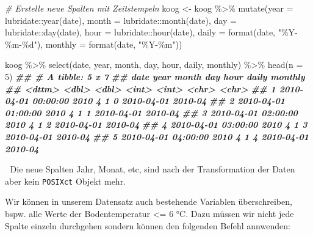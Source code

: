\documentclass[
]{article}
\newenvironment{Shaded}{\begin{snugshade}}{\end{snugshade}}
\newcommand{\AttributeTok}[1]{\textcolor[rgb]{0.77,0.63,0.00}{#1}}
\newcommand{\CommentTok}[1]{\textcolor[rgb]{0.56,0.35,0.01}{\textit{#1}}}
\newcommand{\DecValTok}[1]{\textcolor[rgb]{0.00,0.00,0.81}{#1}}
\newcommand{\DocumentationTok}[1]{\textcolor[rgb]{0.56,0.35,0.01}{\textbf{\textit{#1}}}}
\newcommand{\FunctionTok}[1]{\textcolor[rgb]{0.00,0.00,0.00}{#1}}
\newcommand{\NormalTok}[1]{#1}
\newcommand{\OtherTok}[1]{\textcolor[rgb]{0.56,0.35,0.01}{#1}}
\newcommand{\SpecialCharTok}[1]{\textcolor[rgb]{0.00,0.00,0.00}{#1}}
\newcommand{\StringTok}[1]{\textcolor[rgb]{0.31,0.60,0.02}{#1}}
\begin{document}
\begin{Shaded}
\begin{Highlighting}[]
\CommentTok{\# Erstelle neue Spalten mit Zeitstempeln}
\NormalTok{koog }\OtherTok{\textless{}{-}}\NormalTok{ koog }\SpecialCharTok{\%\textgreater{}\%}
  \FunctionTok{mutate}\NormalTok{(}\AttributeTok{year =}\NormalTok{ lubridate}\SpecialCharTok{::}\FunctionTok{year}\NormalTok{(date),}
         \AttributeTok{month =}\NormalTok{ lubridate}\SpecialCharTok{::}\FunctionTok{month}\NormalTok{(date),}
         \AttributeTok{day =}\NormalTok{ lubridate}\SpecialCharTok{::}\FunctionTok{day}\NormalTok{(date),}
         \AttributeTok{hour =}\NormalTok{ lubridate}\SpecialCharTok{::}\FunctionTok{hour}\NormalTok{(date), }
         \AttributeTok{daily =} \FunctionTok{format}\NormalTok{(date, }\StringTok{"\%Y{-}\%m{-}\%d"}\NormalTok{),}
         \AttributeTok{monthly =} \FunctionTok{format}\NormalTok{(date, }\StringTok{"\%Y{-}\%m"}\NormalTok{))}

\NormalTok{koog }\SpecialCharTok{\%\textgreater{}\%}
  \FunctionTok{select}\NormalTok{(date, year, month, day, hour, daily, monthly) }\SpecialCharTok{\%\textgreater{}\%}
  \FunctionTok{head}\NormalTok{(}\AttributeTok{n =} \DecValTok{5}\NormalTok{)}
\DocumentationTok{\#\# \# A tibble: 5 x 7}
\DocumentationTok{\#\#   date                 year month   day  hour daily      monthly}
\DocumentationTok{\#\#   \textless{}dttm\textgreater{}              \textless{}dbl\textgreater{} \textless{}dbl\textgreater{} \textless{}int\textgreater{} \textless{}int\textgreater{} \textless{}chr\textgreater{}      \textless{}chr\textgreater{}  }
\DocumentationTok{\#\# 1 2010{-}04{-}01 00:00:00  2010     4     1     0 2010{-}04{-}01 2010{-}04}
\DocumentationTok{\#\# 2 2010{-}04{-}01 01:00:00  2010     4     1     1 2010{-}04{-}01 2010{-}04}
\DocumentationTok{\#\# 3 2010{-}04{-}01 02:00:00  2010     4     1     2 2010{-}04{-}01 2010{-}04}
\DocumentationTok{\#\# 4 2010{-}04{-}01 03:00:00  2010     4     1     3 2010{-}04{-}01 2010{-}04}
\DocumentationTok{\#\# 5 2010{-}04{-}01 04:00:00  2010     4     1     4 2010{-}04{-}01 2010{-}04}
\end{Highlighting}
\end{Shaded}

🚨 Die neue Spalten Jahr, Monat, etc, sind nach der Transformation der Daten aber kein \texttt{POSIXct} Objekt mehr.

Wir können in unserem Datensatz auch bestehende Variablen überschreiben, bspw. alle Werte der Bodentemperatur \textless= 6 °C. Dazu müssen wir nicht jede Spalte einzeln durchgehen sondern können den folgenden Befehl annwenden:
\end{document}
